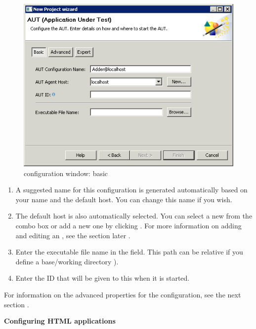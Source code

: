 \begin{figure}[h]
\begin{center}
\includegraphics{Tasks/AUTs/PS/autconfigwindow_basic}
\caption{\gdaut configuration window: basic}
\label{autconfigbasic}
\end{center}
\end{figure}

\begin{enumerate}
\item A suggested name for this \gdaut{} configuration is generated automatically based on your \gdaut{} name and the default \gdagent{} host. You can change this name if you wish. 
\item The default \gdagent host is also automatically selected. You can select a new \gdagent{} from the combo box or add a new one by clicking . For more information on adding and editing an \gdagent{}, see the  section later .

\item Enter the executable file name in the  field. This path can be relative if you define a base/working directory ).
\item Enter the \gdaut{} ID that will be given to this \gdaut{} when it is started.  
\end{enumerate}
For information on the advanced properties for the \gdaut{} configuration, see the next section . 

\textbf{Configuring HTML applications}\\

